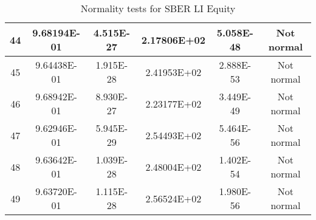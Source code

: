\begin{table}[h]
\begin{tabular}{|c|c|c|c|c|c|}
		44 & 9.68194E-01 & 4.515E-27 & 2.17806E+02 & 5.058E-48 & Not normal\\\hline
		45 & 9.64438E-01 & 1.915E-28 & 2.41953E+02 & 2.888E-53 & Not normal\\\hline
		46 & 9.68942E-01 & 8.930E-27 & 2.23177E+02 & 3.449E-49 & Not normal\\\hline
		47 & 9.62946E-01 & 5.945E-29 & 2.54493E+02 & 5.464E-56 & Not normal\\\hline
		48 & 9.63642E-01 & 1.039E-28 & 2.48004E+02 & 1.402E-54 & Not normal\\\hline
		49 & 9.63720E-01 & 1.115E-28 & 2.56524E+02 & 1.980E-56 & Not normal\\\hline
	\end{tabular}
	\caption{Normality tests for SBER LI Equity}
	\label{tab:normality_tests_SBER_LI}
\end{table}

